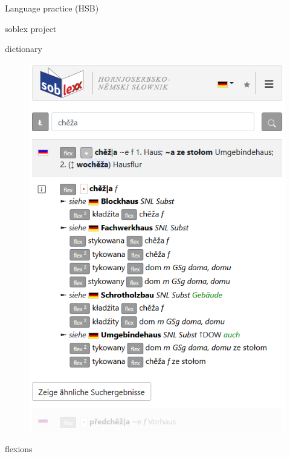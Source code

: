   \begin{block}{Language practice (HSB)}

    
    soblex project\cite{soblex}

    dictionary

    \begin{figure}
        \centering
        \includegraphics[width=0.7\colwidth]{soblex_suche.png}
        \label{fig:soblexsearch}
    \end{figure}

    flexions


\end{block}
